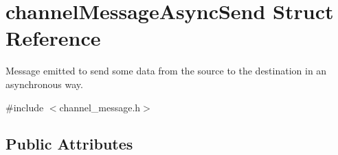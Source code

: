 \hypertarget{structchannelMessageAsyncSend}{\section{channel\-Message\-Async\-Send Struct Reference}
\label{structchannelMessageAsyncSend}
}


Message emitted to send some data from the source to the destination in an asynchronous way.  




{\ttfamily \#include $<$channel\-\_\-message.\-h$>$}

\subsection*{Public Attributes}
